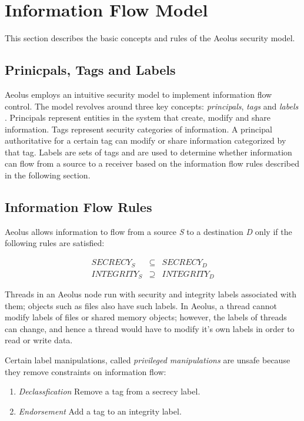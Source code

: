 \section{Information Flow Model}

This section describes the basic concepts and rules of the Aeolus security model.

\subsection{Prinicpals, Tags and Labels}\label{principals}

Aeolus employs an intuitive security model to implement information flow control. The model revolves around three key concepts: \emph{principals}, \emph{tags} and \emph{labels} \cite{aeolus}. Principals represent entities in the system that create, modify and share information. Tags represent security categories of information. A principal authoritative for a certain tag can modify or share information categorized by that tag. Labels are sets of tags and are used to determine whether information can flow from a source to a receiver based on the information flow rules described in the following section.

\subsection{Information Flow Rules}\label{difc:rules}

Aeolus allows information to flow from a source \emph{S} to a destination \emph{D} only if the following rules are satisfied:

\begin{eqnarray*}
  SECRECY_{S} &\subseteq& SECRECY_{D} \\
  INTEGRITY_{S} &\supseteq& INTEGRITY_{D}
\end{eqnarray*}

Threads in an Aeolus node run with security and integrity labels associated with them; objects such as files also have such labels. In Aeolus, a thread cannot modify labels of files or shared memory objects; however, the labels of threads can change, and hence a thread would have to modify it's own labels in order to read or write data. 

Certain label manipulations, called \emph{privileged manipulations} are unsafe because they remove constraints on information flow:

\begin{enumerate}
  \item \emph{Declassfication} Remove a tag from a secrecy label.
  \item \emph{Endorsement} Add a tag to an integrity label.
\end{enumerate}

